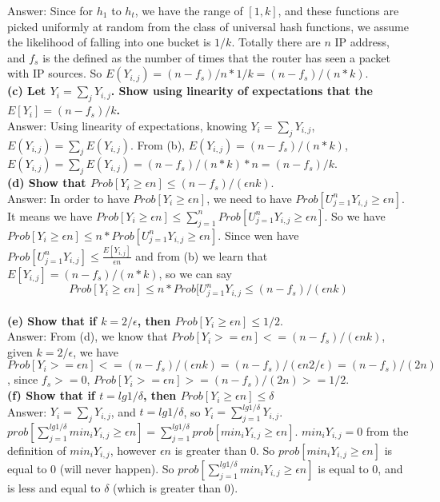 \documentclass{article}
\begin{document}
Answer: Since for $h_1$ to $h_t$, we have the range of $[1,k]$, and these functions are picked uniformly at random from the class of universal hash functions, we assume the likelihood of falling into one bucket is $1/k$. Totally there are $n$ IP address, and $f_s$ is the defined as the number of times that the router has seen a packet with IP sources. So $E(Y_{i,j}) =(n-f_s)/n * 1/k = (n-f_s)/(n*k)$.\\ \newline
\textbf{(c) Let $Y_i = \sum_jY_{i,j}$. Show using linearity of expectations that the $E[Y_i] = (n - f_s)/k$.} \\ \newline
Answer: Using linearity of expectations, knowing $Y_i = \sum_{j} Y_{i,j}$, $E(Y_{i,j}) =  \sum_{j} E(Y_{i,j})$. From (b), $E(Y_{i,j}) = (n-f_s)/(n*k)$,  $E(Y_{i,j}) =  \sum_{j} E(Y_{i,j}) =(n-f_s)/(n*k) * n =  (n-f_s)/k$.\\ \newline
\textbf{(d) Show that $Prob[Y_i \geq \epsilon n] \leq (n - f_s)/(\epsilon nk)$}. \\ \newline
Answer: In order to have $Prob[Y_i \geq \epsilon n]$, we need to have $Prob[U_{j=1}^{n}Y_{i,j}\geq \epsilon n]$. It means we have $Prob[Y_i \geq \epsilon n]\leq \sum_{j=1}^{n}Prob[U_{j=1}^{n}Y_{i,j}\geq \epsilon n]$. So we have $Prob[Y_i \geq \epsilon n]\leq n*Prob[U_{j=1}^{n}Y_{i,j}\geq \epsilon n]$. Since wen have $Prob[U_{j=1}^{n}Y_{i,j}] \leq \frac{E[Y_{i,j}]}{\epsilon n}$ and from (b) we learn that $E[Y_{i,j}] = (n - f_s)/(n*k)$, so we can say $$Prob[Y_i \geq \epsilon n]\leq n*Prob[U_{j=1}^{n}Y_{i,j} \leq (n - f_s)/(\epsilon nk)$$\\
\textbf{(e) Show that if $k = 2/\epsilon$, then $Prob[Y_i \geq \epsilon n] \leq 1/2$}. \\ \newline
Answer: From (d), we know that $Prob[Y_i>=\epsilon n] <= (n-f_s)/(\epsilon nk)$, given $k = 2/\epsilon$, we have $Prob[Y_i>=\epsilon n] <= (n-f_s)/(\epsilon nk) = (n-f_s)/(\epsilon n 2/\epsilon) = (n-f_s)/(2n)$, since $f_s>=0$,  $Prob[Y_i>=\epsilon n] > = (n-f_s)/(2n) >=1/2$.\\ \newline
\textbf{(f) Show that if $t = lg1/\delta$, then $Prob[Y_i \geq \epsilon n] \leq \delta$} \\ \newline
Answer: $Y_i = \sum_{j} Y_{i,j}$, and $t=lg1/\delta$, so $Y_i = \sum_{j=1}^{lg1/\delta} Y_{i,j}$. $prob[\sum_{j=1}^{lg1/\delta} min_i Y_{i,j} \geq \epsilon n] =  \sum_{j=1}^{lg1/\delta} prob[min_i Y_{i,j} \geq \epsilon n]$. $min_i Y_{i,j} = 0$ from the definition of $min_i Y_{i,j}$, however $\epsilon n$ is greater than 0. So $prob[min_i Y_{i,j} \geq \epsilon n]$ is equal to 0 (will never happen). So $prob[\sum_{j=1}^{lg1/\delta} min_i Y_{i,j} \geq \epsilon n] $ is equal to 0, and is less and equal to $\delta$ (which is greater than 0).   \\ \newline
\end{document}
